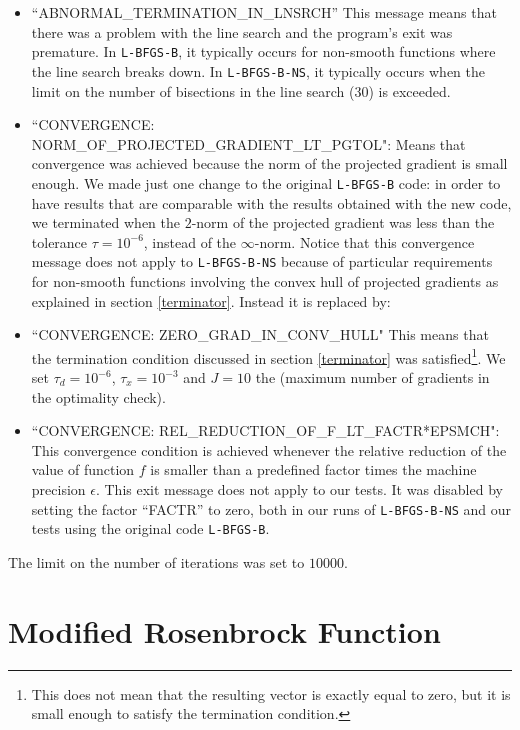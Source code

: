 \begin{itemize}

\item ``ABNORMAL\_TERMINATION\_IN\_LNSRCH'' This message means that there was a problem with the line search and the program's exit was premature. In \texttt{L-BFGS-B}, it typically occurs for non-smooth functions where the line search breaks down. In \texttt{L-BFGS-B-NS}, it typically occurs when the limit on the number of bisections in the line search ($30$) is exceeded.

\item ``CONVERGENCE: NORM\_OF\_PROJECTED\_GRADIENT\_LT\_PGTOL": Means that convergence was achieved because the norm of the projected gradient is small enough. We made just one change to the original \texttt{L-BFGS-B} code: in order to have results that are comparable with the results obtained with the new code, we terminated when the $2$-norm of the projected gradient was less than the tolerance $\tau =10^{-6}$, instead of the $\infty$-norm. Notice that this convergence message does not apply to \texttt{L-BFGS-B-NS} because of particular requirements for non-smooth functions involving the convex hull of projected gradients as explained in section \ref{terminator}. Instead it is replaced by:

\item ``CONVERGENCE: ZERO\_GRAD\_IN\_CONV\_HULL" This means that the termination condition discussed in section \ref{terminator} was satisfied\footnote{This does not mean that the resulting vector is exactly equal to zero, but it is small enough to satisfy the termination condition.}. We set $\tau_d = 10^{-6}$, $\tau_x = 10^{-3}$ and $J = 10$ the (maximum number of gradients in the optimality check).

\item ``CONVERGENCE: REL\_REDUCTION\_OF\_F\_LT\_FACTR*EPSMCH": This convergence condition is achieved whenever the relative reduction of the value of function $f$ is smaller than a predefined factor times the machine precision $\epsilon$. This exit message does not apply to our tests. It was disabled by setting the factor ``FACTR'' to zero, both in our runs of \texttt{L-BFGS-B-NS} and our tests using the original code \texttt{L-BFGS-B}.

\end{itemize}

The limit on the number of iterations was set to $10000$.

\section{Modified Rosenbrock Function} \label{ros}

